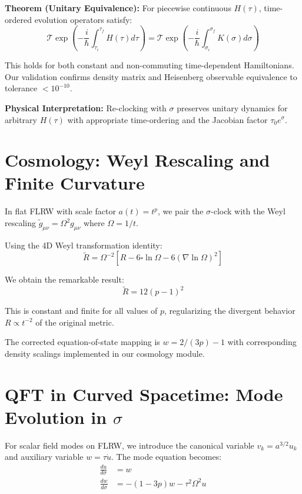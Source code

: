 \documentclass[11pt]{article}
\begin{document}
\textbf{Theorem (Unitary Equivalence):} For piecewise continuous $H(\tau)$, time-ordered evolution operators satisfy:
\begin{equation}
\mathcal{T} \exp\left(-\frac{i}{\hbar}\int_{\tau_i}^{\tau_f} H(\tau) d\tau\right) = \mathcal{T} \exp\left(-\frac{i}{\hbar}\int_{\sigma_i}^{\sigma_f} K(\sigma) d\sigma\right)
\end{equation}

This holds for both constant and non-commuting time-dependent Hamiltonians. Our validation confirms density matrix and Heisenberg observable equivalence to tolerance $< 10^{-10}$.

\textbf{Physical Interpretation:} Re-clocking with $\sigma$ preserves unitary dynamics for arbitrary $H(\tau)$ with appropriate time-ordering and the Jacobian factor $\tau_0 e^\sigma$.

\section{Cosmology: Weyl Rescaling and Finite Curvature}

In flat FLRW with scale factor $a(t) = t^p$, we pair the $\sigma$-clock with the Weyl rescaling $\tilde{g}_{\mu\nu} = \Omega^2 g_{\mu\nu}$ where $\Omega = 1/t$.

Using the 4D Weyl transformation identity:
\begin{equation}
\tilde{R} = \Omega^{-2}[R - 6\square\ln\Omega - 6(\nabla\ln\Omega)^2]
\end{equation}

We obtain the remarkable result:
\begin{equation}
\boxed{\tilde{R} = 12(p-1)^2}
\end{equation}

This is constant and finite for all values of $p$, regularizing the divergent behavior $R \propto t^{-2}$ of the original metric.

The corrected equation-of-state mapping is $w = 2/(3p) - 1$ with corresponding density scalings implemented in our cosmology module.

\section{QFT in Curved Spacetime: Mode Evolution in $\sigma$}

For scalar field modes on FLRW, we introduce the canonical variable $v_k = a^{3/2} u_k$ and auxiliary variable $w = \tau \dot{u}$. The mode equation becomes:
\begin{align}
\frac{du}{d\sigma} &= w \\
\frac{dw}{d\sigma} &= -(1-3p)w - \tau^2\Omega^2 u
\end{align}
\end{document}
